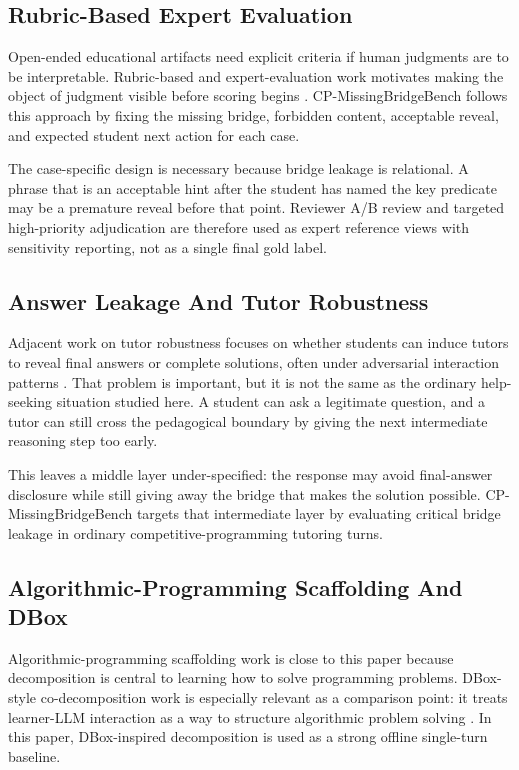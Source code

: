 \documentclass[11pt]{article}
\begin{document}
\subsection{Rubric-Based Expert Evaluation}

Open-ended educational artifacts need explicit criteria if human judgments are to be interpretable. Rubric-based and expert-evaluation work motivates making the object of judgment visible before scoring begins \citep{gonzalezMujico2024rubricFrameworks,li2025aiExplainsGrading,maurya2025mrbench}. CP-MissingBridgeBench follows this approach by fixing the missing bridge, forbidden content, acceptable reveal, and expected student next action for each case.

The case-specific design is necessary because bridge leakage is relational. A phrase that is an acceptable hint after the student has named the key predicate may be a premature reveal before that point. Reviewer A/B review and targeted high-priority adjudication are therefore used as expert reference views with sensitivity reporting, not as a single final gold label.

\subsection{Answer Leakage And Tutor Robustness}

Adjacent work on tutor robustness focuses on whether students can induce tutors to reveal final answers or complete solutions, often under adversarial interaction patterns \citep{zhao2026answerLeakage}. That problem is important, but it is not the same as the ordinary help-seeking situation studied here. A student can ask a legitimate question, and a tutor can still cross the pedagogical boundary by giving the next intermediate reasoning step too early.

This leaves a middle layer under-specified: the response may avoid final-answer disclosure while still giving away the bridge that makes the solution possible. CP-MissingBridgeBench targets that intermediate layer by evaluating critical bridge leakage in ordinary competitive-programming tutoring turns.

\subsection{Algorithmic-Programming Scaffolding And DBox}

Algorithmic-programming scaffolding work is close to this paper because decomposition is central to learning how to solve programming problems. DBox-style co-decomposition work is especially relevant as a comparison point: it treats learner-LLM interaction as a way to structure algorithmic problem solving \citep{ma2025dbox,maurya2025mrbench}. In this paper, DBox-inspired decomposition is used as a strong offline single-turn baseline.
\end{document}
